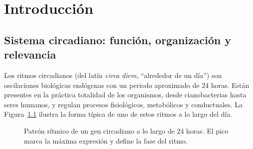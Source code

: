 \documentclass[12pt, a4paper]{report}
\begin{document}
\tableofcontents
\newpage
\listoffigures
\newpage
\listoftables
\newpage


\chapter{Introducción}

\section{Sistema circadiano: función, organización y relevancia}

Los ritmos circadianos (del latín \textit{circa diem}, ``alrededor de un día'') son oscilaciones biológicas endógenas con un periodo aproximado de 24 horas. Están presentes en la práctica totalidad de los organismos, desde cianobacterias hasta seres humanos, y regulan procesos fisiológicos, metabólicos y conductuales. La Figura~\ref{fig:oscilacion} ilustra la forma típica de uno de estos ritmos a lo largo del día.

\begin{figure}[htbp]
\centering
{}
\caption[Patrón rítmico de un gen circadiano en 24 horas.]{Patrón rítmico de un gen circadiano a lo largo de 24 horas. El pico marca la máxima expresión y define la fase del ritmo.}
\label{fig:oscilacion}
\end{figure}
\end{document}
